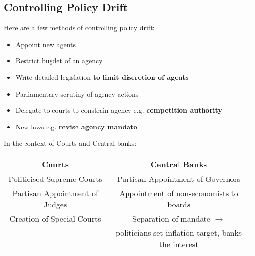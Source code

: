 \documentclass[12pt, letterpaper]{article}
\begin{document}
\subsection{Controlling Policy Drift}
Here are a few methods of controlling policy drift:
\begin{itemize}
	\item Appoint new agents
	\item Restrict bugdet of an agency
	\item Write detailed legislation \textbf{to limit discretion of agents}
	\item Parliamentary scrutiny of agency actions
	\item Delegate to courts to constrain agency e.g. \textbf{competition authority}
	\item New laws e.g. \textbf{revise agency mandate}
\end{itemize}
In the context of Courts and Central banks:
\begin{center}
\begin{adjustbox}{width=.85\textwidth}
\begin{tabular}{c|c}

Courts & Central Banks\\
\hline
Politicised Supreme Courts & Partisan Appointment of Governors\\
Partisan Appointment of Judges & Appointment of non-economists to boards\\
Creation of Special Courts & Separation of mandate $\rightarrow$\\ 
& politicians set inflation target, banks the interest\\
\hline

\end{tabular}
\end{adjustbox}
\end{center}
\end{document}
